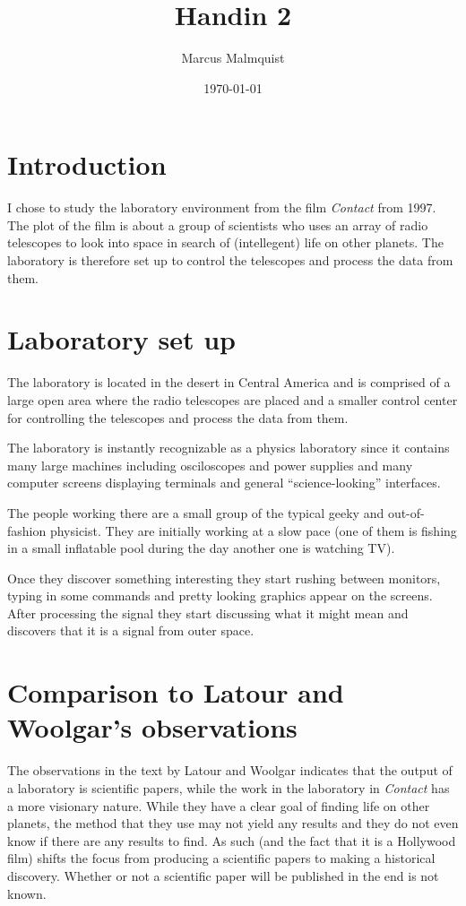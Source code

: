 \documentclass[12pt,a4paper]{IEEEtran}
\title{Handin 2}
\author{Marcus Malmquist}
\date{\today}
\begin{document}
\maketitle
\section{Introduction}
I chose to study the laboratory environment from the film \textit{Contact} from 1997. The plot of the film is about a group of scientists who uses an array of radio telescopes to look into space in search of (intellegent) life on other planets. The laboratory is therefore set up to control the telescopes and process the data from them.

\section{Laboratory set up}
The laboratory is located in the desert in Central America and is comprised of a large open area where the radio telescopes are placed and a smaller control center for controlling the telescopes and process the data from them.

The laboratory is instantly recognizable as a physics laboratory since it contains many large machines including osciloscopes and power supplies and many computer screens displaying terminals and general ``science-looking'' interfaces.

The people working there are a small group of the typical geeky and out-of-fashion physicist. They are initially working at a slow pace (one of them is fishing in a small inflatable pool during the day another one is watching TV).

Once they discover something interesting they start rushing between monitors, typing in some commands and pretty looking graphics appear on the screens. After processing the signal they start discussing what it might mean and discovers that it is a signal from outer space.

\section{Comparison to Latour and Woolgar's observations}
The observations in the text by Latour and Woolgar indicates that the output of a laboratory is scientific papers, while the work in the laboratory in \textit{Contact} has a more visionary nature. While they have a clear goal of finding life on other planets, the method that they use may not yield any results and they do not even know if there are any results to find. As such (and the fact that it is a Hollywood film) shifts the focus from producing a scientific papers to making a historical discovery. Whether or not a scientific paper will be published in the end is not known.
\end{document}
